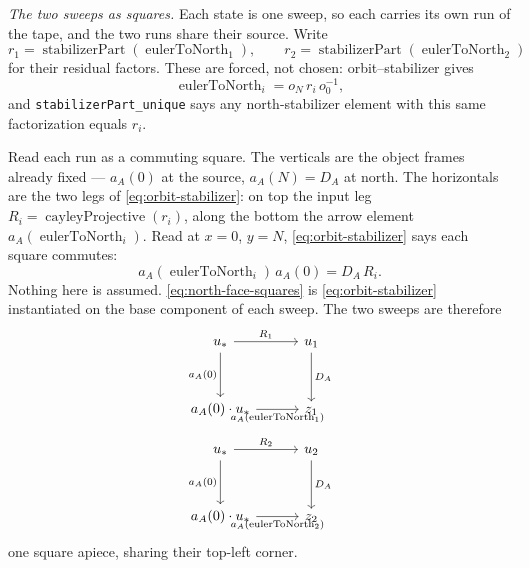 %

\medskip
\noindent\emph{The two sweeps as squares.}
Each state is one sweep, so each carries its own run of the tape, and the two
runs share their source. Write
\[
  r_1=\operatorname{stabilizerPart}(\operatorname{eulerToNorth}_1),\qquad
  r_2=\operatorname{stabilizerPart}(\operatorname{eulerToNorth}_2)
\]
for their residual factors. These are forced, not chosen: orbit--stabilizer
gives
\[
  \operatorname{eulerToNorth}_i=o_N\,r_i\,o_0^{-1},
\]
and \texttt{stabilizerPart\_unique} says any north-stabilizer element with this
same factorization equals $r_i$.

Read each run as a commuting square. The verticals are the object frames
already fixed --- $a_A(0)$ at the source, $a_A(N)=D_A$ at north. The horizontals
are the two legs of \eqref{eq:orbit-stabilizer}: on top the input leg
$R_i=\operatorname{cayleyProjective}(r_i)$, along the bottom the arrow element
$a_A(\operatorname{eulerToNorth}_i)$. Read at $x=0$, $y=N$,
\eqref{eq:orbit-stabilizer} says each square commutes:
\[
  a_A(\operatorname{eulerToNorth}_i)\,a_A(0)=D_A\,R_i .
                                    \tag{S}\label{eq:north-face-squares}
\]
Nothing here is assumed. \eqref{eq:north-face-squares} is
\eqref{eq:orbit-stabilizer} instantiated on the base component of each sweep.
The two sweeps are therefore
\[
\begin{tikzcd}[column sep=3em,row sep=3.2em,ampersand replacement=\&]
u_\ast \arrow[r,"R_1"] \arrow[d,"a_A(0)"']\&
u_1 \arrow[d,"D_A"]\\
a_A(0)\mathbin{\cdot}u_\ast
  \arrow[r,"a_A(\operatorname{eulerToNorth}_1)"']\&
z_1
\end{tikzcd}
\]
\[
\begin{tikzcd}[column sep=3em,row sep=3.2em,ampersand replacement=\&]
u_\ast \arrow[r,"R_2"] \arrow[d,"a_A(0)"']\&
u_2 \arrow[d,"D_A"]\\
a_A(0)\mathbin{\cdot}u_\ast
  \arrow[r,"a_A(\operatorname{eulerToNorth}_2)"']\&
z_2
\end{tikzcd}
\]
one square apiece, sharing their top-left corner.

